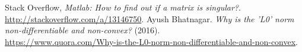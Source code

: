 \documentclass[a4paper,UTF8]{article}
\numberwithin{equation}{section}
\theoremstyle{definition}
\begin{document}
\begin{thebibliography}{99}
 Stack Overflow, \textit{Matlab: How to find out if a matrix is singular?}.\\ \url{http://stackoverflow.com/a/13146750}.
 Ayush Bhatnagar. \textit{Why is the 'L0' norm non-differentiable and non-convex?} (2016). \\ \url{https://www.quora.com/Why-is-the-L0-norm-non-differentiable-and-non-convex}.
\end{thebibliography}
\end{document}
